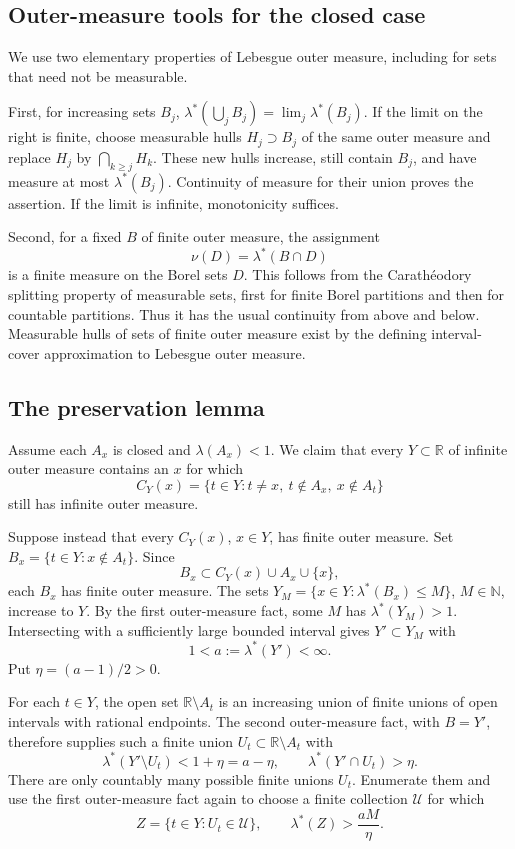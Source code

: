 \subsection*{Outer-measure tools for the closed case}
We use two elementary properties of Lebesgue outer measure, including for sets that need not be measurable.

First, for increasing sets $B_j$,
$\lambda^*(\bigcup_jB_j)=\lim_j\lambda^*(B_j)$.
If the limit on the right is finite, choose measurable hulls $H_j\supset B_j$ of the same outer measure and replace $H_j$ by $\bigcap_{k\ge j}H_k$. These new hulls increase, still contain $B_j$, and have measure at most $\lambda^*(B_j)$. Continuity of measure for their union proves the assertion. If the limit is infinite, monotonicity suffices.

Second, for a fixed $B$ of finite outer measure, the assignment
\[
 \nu(D)=\lambda^*(B\cap D)
\]
is a finite measure on the Borel sets $D$. This follows from the Carath\'eodory splitting property of measurable sets, first for finite Borel partitions and then for countable partitions. Thus it has the usual continuity from above and below. Measurable hulls of sets of finite outer measure exist by the defining interval-cover approximation to Lebesgue outer measure.

\subsection*{The preservation lemma}
Assume each $A_x$ is closed and $\lambda(A_x)<1$. We claim that every $Y\subset\mathbb R$ of infinite outer measure contains an $x$ for which
\[
 C_Y(x)=\{t\in Y:t\ne x,\ t\notin A_x,\ x\notin A_t\}
\]
still has infinite outer measure.

Suppose instead that every $C_Y(x)$, $x\in Y$, has finite outer measure. Set
$B_x=\{t\in Y:x\notin A_t\}$. Since
\[
 B_x\subset C_Y(x)\cup A_x\cup\{x\},
\]
each $B_x$ has finite outer measure. The sets
$Y_M=\{x\in Y:\lambda^*(B_x)\le M\}$, $M\in\mathbb N$, increase to $Y$. By the first outer-measure fact, some $M$ has $\lambda^*(Y_M)>1$. Intersecting with a sufficiently large bounded interval gives $Y'\subset Y_M$ with
\[
 1<a:=\lambda^*(Y')<\infty.
\]
Put $\eta=(a-1)/2>0$.

For each $t\in Y$, the open set $\mathbb R\setminus A_t$ is an increasing union of finite unions of open intervals with rational endpoints. The second outer-measure fact, with $B=Y'$, therefore supplies such a finite union $U_t\subset\mathbb R\setminus A_t$ with
\[
 \lambda^*(Y'\setminus U_t)<1+\eta=a-\eta,
 \qquad \lambda^*(Y'\cap U_t)>\eta. \tag{2}
\]
There are only countably many possible finite unions $U_t$. Enumerate them and use the first outer-measure fact again to choose a finite collection $\mathcal U$ for which
\[
 Z=\{t\in Y:U_t\in\mathcal U\},
 \qquad \lambda^*(Z)>\frac{aM}{\eta}. \tag{3}
\]

